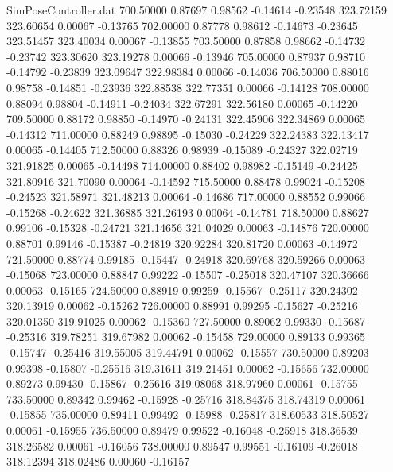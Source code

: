 \begin{filecontents}{SimPoseController.dat}
 700.50000    0.87697    0.98562    -0.14614   -0.23548  323.72159  323.60654    0.00067   -0.13765
 702.00000    0.87778    0.98612    -0.14673   -0.23645  323.51457  323.40034    0.00067   -0.13855
 703.50000    0.87858    0.98662    -0.14732   -0.23742  323.30620  323.19278    0.00066   -0.13946
 705.00000    0.87937    0.98710    -0.14792   -0.23839  323.09647  322.98384    0.00066   -0.14036
 706.50000    0.88016    0.98758    -0.14851   -0.23936  322.88538  322.77351    0.00066   -0.14128
 708.00000    0.88094    0.98804    -0.14911   -0.24034  322.67291  322.56180    0.00065   -0.14220
 709.50000    0.88172    0.98850    -0.14970   -0.24131  322.45906  322.34869    0.00065   -0.14312
 711.00000    0.88249    0.98895    -0.15030   -0.24229  322.24383  322.13417    0.00065   -0.14405
 712.50000    0.88326    0.98939    -0.15089   -0.24327  322.02719  321.91825    0.00065   -0.14498
 714.00000    0.88402    0.98982    -0.15149   -0.24425  321.80916  321.70090    0.00064   -0.14592
 715.50000    0.88478    0.99024    -0.15208   -0.24523  321.58971  321.48213    0.00064   -0.14686
 717.00000    0.88552    0.99066    -0.15268   -0.24622  321.36885  321.26193    0.00064   -0.14781
 718.50000    0.88627    0.99106    -0.15328   -0.24721  321.14656  321.04029    0.00063   -0.14876
 720.00000    0.88701    0.99146    -0.15387   -0.24819  320.92284  320.81720    0.00063   -0.14972
 721.50000    0.88774    0.99185    -0.15447   -0.24918  320.69768  320.59266    0.00063   -0.15068
 723.00000    0.88847    0.99222    -0.15507   -0.25018  320.47107  320.36666    0.00063   -0.15165
 724.50000    0.88919    0.99259    -0.15567   -0.25117  320.24302  320.13919    0.00062   -0.15262
 726.00000    0.88991    0.99295    -0.15627   -0.25216  320.01350  319.91025    0.00062   -0.15360
 727.50000    0.89062    0.99330    -0.15687   -0.25316  319.78251  319.67982    0.00062   -0.15458
 729.00000    0.89133    0.99365    -0.15747   -0.25416  319.55005  319.44791    0.00062   -0.15557
 730.50000    0.89203    0.99398    -0.15807   -0.25516  319.31611  319.21451    0.00062   -0.15656
 732.00000    0.89273    0.99430    -0.15867   -0.25616  319.08068  318.97960    0.00061   -0.15755
 733.50000    0.89342    0.99462    -0.15928   -0.25716  318.84375  318.74319    0.00061   -0.15855
 735.00000    0.89411    0.99492    -0.15988   -0.25817  318.60533  318.50527    0.00061   -0.15955
 736.50000    0.89479    0.99522    -0.16048   -0.25918  318.36539  318.26582    0.00061   -0.16056
 738.00000    0.89547    0.99551    -0.16109   -0.26018  318.12394  318.02486    0.00060   -0.16157

\end{filecontents}
